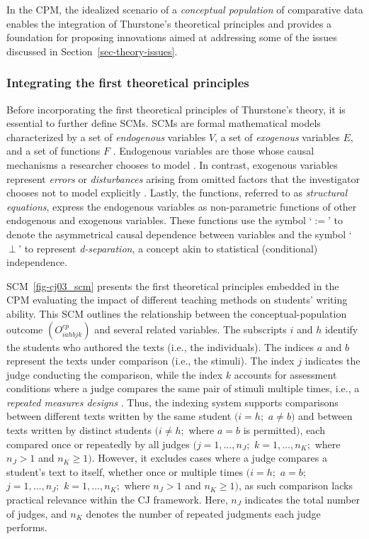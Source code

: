 \documentclass[
  authoryear,
  review,
  1p]{elsarticle}
\begin{document}
In the CPM, the idealized scenario of a \emph{conceptual population} of
comparative data enables the integration of Thurstone's theoretical
principles and provides a foundation for proposing innovations aimed at
addressing some of the issues discussed in
Section~\ref{sec-theory-issues}.

\subsubsection{Integrating the first theoretical
principles}\label{sec-theory-theoretical_P1}

Before incorporating the first theoretical principles of Thurstone's
theory, it is essential to further define SCMs. SCMs are formal
mathematical models characterized by a set of \emph{endogenous}
variables \(V\), a set of \emph{exogenous} variables \(E\), and a set of
functions \(F\)
\citep{Pearl_2009, Pearl_et_al_2016, Cinelli_et_al_2020}. Endogenous
variables are those whose causal mechanisms a researcher chooses to
model \citep{Neal_2020}. In contrast, exogenous variables represent
\emph{errors} or \emph{disturbances} arising from omitted factors that
the investigator chooses not to model explicitly \citep{Pearl_2009}.
Lastly, the functions, referred to as \emph{structural equations},
express the endogenous variables as non-parametric functions of other
endogenous and exogenous variables. These functions use the symbol
`\(:=\)' to denote the asymmetrical causal dependence between variables
and the symbol `\(\:\bot\:\)' to represent \emph{d-separation}, a
concept akin to statistical (conditional) independence.

SCM~\ref{fig-cj03_scm} presents the first theoretical principles
embedded in the CPM evaluating the impact of different teaching methods
on students' writing ability. This SCM outlines the relationship between
the conceptual-population outcome \((O^{cp}_{iahbjk})\) and several
related variables. The subscripts \(i\) and \(h\) identify the students
who authored the texts (i.e., the individuals). The indices \(a\) and
\(b\) represent the texts under comparison (i.e., the stimuli). The
index \(j\) indicates the judge conducting the comparison, while the
index \(k\) accounts for assessment conditions where a judge compares
the same pair of stimuli multiple times, i.e., a \emph{repeated measures
designs} \citep{Lawson_2015}. Thus, the indexing system supports
comparisons between different texts written by the same student
\((i = h;\) \(a \neq b)\) and between texts written by distinct students
\((i \neq h;\) where \(a = b\) is permitted\()\), each compared once or
repeatedly by all judges \((j = 1,\dots,n_{J};\) \(k = 1,\dots,n_K;\)
where \(n_{J}>1\) and \(n_{K}\geq1)\). However, it excludes cases where
a judge compares a student's text to itself, whether once or multiple
times \((i = h;\) \(a = b;\) \(j = 1,\dots,n_{J};\)
\(k = 1,\dots,n_{K};\) where \(n_{J}>1\) and \(n_{K}\geq1)\), as such
comparison lacks practical relevance within the CJ framework. Here,
\(n_{J}\) indicates the total number of judges, and \(n_{K}\) denotes
the number of repeated judgments each judge performs.
\end{document}
